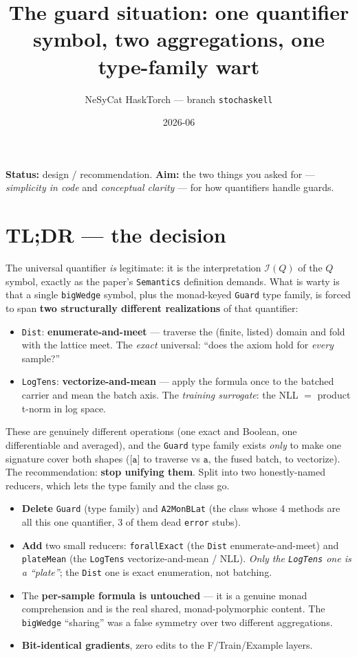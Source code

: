 \documentclass[11pt]{article}
\title{The guard situation: one quantifier symbol, two aggregations, one type-family wart}
\author{NeSyCat HaskTorch --- branch \texttt{stochaskell}}
\date{2026-06}
\newcommand{\code}[1]{\texttt{#1}}
\newcommand{\Int}{\mathcal I}
\begin{document}
\maketitle

\noindent\textbf{Status:} design / recommendation. \textbf{Aim:} the two things you asked for ---
\emph{simplicity in code} and \emph{conceptual clarity} --- for how quantifiers handle guards.

\section*{TL;DR --- the decision}

The universal quantifier \emph{is} legitimate: it is the interpretation $\Int(Q)$ of the $Q$ symbol,
exactly as the paper's \code{Semantics} definition demands. What is warty is that a single
\code{bigWedge} symbol, plus the monad-keyed \code{Guard} type family, is forced to span \textbf{two
structurally different realizations} of that quantifier:

\begin{itemize}
  \item \code{Dist}: \textbf{enumerate-and-meet} --- traverse the (finite, listed) domain and fold with
        the lattice meet. The \emph{exact} universal: ``does the axiom hold for \emph{every} sample?''
  \item \code{LogTens}: \textbf{vectorize-and-mean} --- apply the formula once to the batched carrier and
        mean the batch axis. The \emph{training surrogate}: the NLL $=$ product t-norm in log space.
\end{itemize}

These are genuinely different operations (one exact and Boolean, one differentiable and averaged), and
the \code{Guard} type family exists \emph{only} to make one signature cover both shapes
($\code{[a]}$ to traverse vs $\code{a}$, the fused batch, to vectorize). The recommendation: \textbf{stop
unifying them}. Split into two honestly-named reducers, which lets the type family and the class go.

\begin{itemize}
  \item \textbf{Delete} \code{Guard} (type family) and \code{A2MonBLat} (the class whose 4 methods are
        all this one quantifier, 3 of them dead \code{error} stubs).
  \item \textbf{Add} two small reducers: \code{forallExact} (the \code{Dist} enumerate-and-meet) and
        \code{plateMean} (the \code{LogTens} vectorize-and-mean / NLL). \emph{Only the \code{LogTens} one is
        a ``plate''}; the \code{Dist} one is exact enumeration, not batching.
  \item The \textbf{per-sample formula is untouched} --- it is a genuine monad comprehension and is the
        real shared, monad-polymorphic content. The \code{bigWedge} ``sharing'' was a false symmetry over
        two different aggregations.
  \item \textbf{Bit-identical gradients}, zero edits to the F/Train/Example layers.
\end{itemize}
\end{document}
